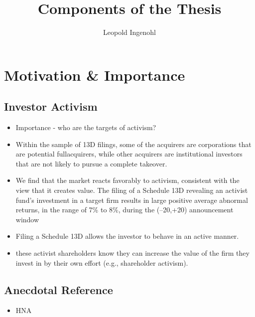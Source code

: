 \documentclass[12pt]{article}
\title{Components of the Thesis}
\author{Leopold Ingenohl}
\begin{document}
\maketitle

\pagebreak

\tableofcontents

\pagebreak

\section{Motivation \& Importance} 

\subsection{Investor Activism}

    \begin{itemize}
        \item Importance - who are the targets of activism? \citep{CoffeeJr.2014}
        \item Within the sample of 13D filings, some of the acquirers are corporations that are potential fullacquirers, while other acquirers are institutional investors that are not likely to pursue a complete takeover. \citep{Brigida2012}
        \item We find that the market reacts favorably to activism, consistent with the view that it creates value. The filing of a Schedule 13D revealing an activist fund’s investment in a target firm results in large positive average abnormal returns, in the range of 7\% to 8\%, during the (–20,+20) announcement window \citep{Brav2008}
        \item Filing a Schedule 13D allows the investor to behave in an active manner. \citep{Brigida2012}
        \item these activist shareholders know they can increase the value of the firm they invest in by their own effort (e.g., shareholder activism).\citep{Collin-Dufresne2015}
    \end{itemize}

\subsection{Anecdotal Reference}

    \begin{itemize}
        \item HNA 
    \end{itemize}
\end{document}
